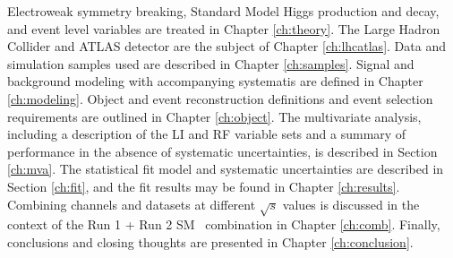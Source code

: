 

Electroweak symmetry breaking, Standard Model Higgs production and decay, and event level variables are treated in Chapter \ref{ch:theory}.  The Large Hadron Collider and ATLAS detector are the subject of Chapter \ref{ch:lhcatlas}.  Data and simulation samples used are described in Chapter \ref{ch:samples}.  Signal and background modeling with accompanying systematis are defined in Chapter \ref{ch:modeling}.  Object and event reconstruction definitions and event selection requirements are outlined in Chapter \ref{ch:object}.  The multivariate analysis, including a description of the LI and RF variable sets and a summary of performance  in the absence of systematic uncertainties, is described in Section \ref{ch:mva}.  The statistical fit model and systematic uncertainties are described in Section \ref{ch:fit}, and the fit results may be found in Chapter \ref{ch:results}.  Combining channels and datasets at different $\sqrt{s}$ values is discussed in the context of the Run 1 + Run 2 SM \vhbb\, combination in Chapter \ref{ch:comb}.  Finally, conclusions and closing thoughts are presented in Chapter \ref{ch:conclusion}.


